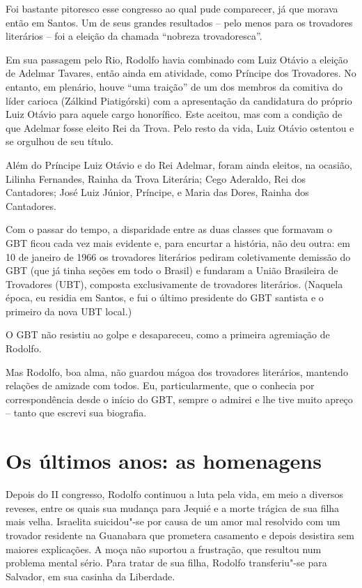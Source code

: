  Foi bastante pitoresco esse congresso ao qual pude comparecer, já que
morava então em Santos. Um de seus grandes resultados -- pelo menos
para os trovadores literários -- foi a eleição da chamada
``nobreza trovadoresca''. 

 Em sua passagem pelo Rio, Rodolfo havia combinado com Luiz Otávio a
eleição de Adelmar Tavares, então ainda em atividade, como Príncipe dos
Trovadores. No entanto, em plenário, houve ``uma
traição'' de um dos membros da comitiva do líder carioca
(Zálkind Piatigórski) com a apresentação da candidatura do próprio Luiz
Otávio para aquele cargo honorífico. Este aceitou, mas com a condição
de que Adelmar fosse eleito Rei da Trova. Pelo resto da vida, Luiz
Otávio ostentou e se orgulhou de seu título. 

 Além do Príncipe Luiz Otávio e do Rei Adelmar, foram ainda eleitos, na
ocasião, Lilinha Fernandes, Rainha da Trova Literária; Cego Aderaldo,
Rei dos Cantadores; José Luiz Júnior, Príncipe, e Maria das Dores,
Rainha dos Cantadores. 

 Com o passar do tempo, a disparidade entre as duas classes que formavam
o GBT ficou cada vez mais evidente e, para encurtar a história, não deu
outra: em 10 de janeiro de 1966 os trovadores literários pediram
coletivamente demissão do GBT (que já tinha seções em todo o Brasil) e
fundaram a União Brasileira de Trovadores (UBT), composta
exclusivamente de trovadores literários. (Naquela época, eu residia em
Santos, e fui o último presidente do GBT santista e o primeiro da nova
UBT local.) 

 O GBT não resistiu ao golpe e desapareceu, como a primeira agremiação
de Rodolfo. 

 Mas Rodolfo, boa alma, não guardou mágoa dos trovadores literários,
mantendo relações de amizade com todos. Eu, particularmente, que o
conhecia por correspondência desde o início do GBT, sempre o admirei e
lhe tive muito apreço -- tanto que escrevi sua biografia. 

\section{Os últimos anos: as homenagens}


 Depois do II congresso, Rodolfo continuou a luta pela vida, em meio a
diversos reveses, entre os quais sua mudança para Jequié e a morte
trágica de sua filha mais velha. Israelita suicidou"-se por causa de
um amor mal resolvido com um trovador residente na Guanabara que
prometera casamento e depois desistira sem maiores explicações. A moça
não suportou a frustração, que resultou num problema mental sério. Para
tratar de sua filha, Rodolfo transferiu"-se para Salvador, em sua
casinha da Liberdade. 

